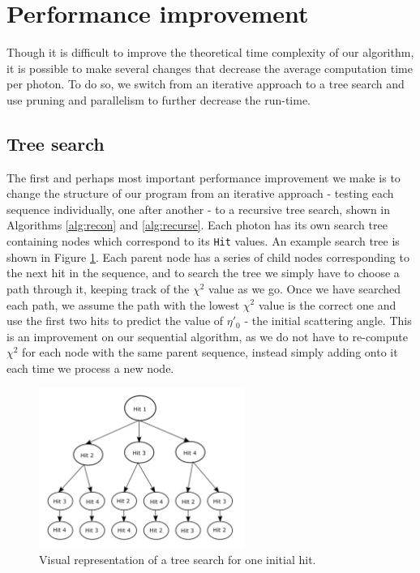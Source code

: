 \section{Performance improvement}
Though it is difficult to improve the theoretical time complexity of our algorithm, it is possible to make several changes that decrease the average computation time per photon. To do so, we switch from an iterative approach to a tree search and use pruning and parallelism to further decrease the run-time.

\subsection{Tree search}
The first and perhaps most important performance improvement we make is to change the structure of our program from an iterative approach - testing each sequence individually, one after another - to a recursive tree search, shown in Algorithms \ref{alg:recon} and \ref{alg:recurse}. Each photon has its own search tree containing nodes which correspond to its \texttt{Hit} values. An example search tree is shown in Figure \ref{fig:tree}. Each parent node has a series of child nodes corresponding to the next hit in the sequence, and to search the tree we simply have to choose a path through it, keeping track of the $\chi^2$ value as we go. Once we have searched each path, we assume the path with the lowest $\chi^2$ value is the correct one and use the first two hits to predict the value of $\eta'_0$ - the initial scattering angle. This is an improvement on our sequential algorithm, as we do not have to re-compute $\chi^2$ for each node with the same parent sequence, instead simply adding onto it each time we process a new node.

\begin{figure}
    \centering
    \includegraphics[width=0.6\textwidth]{tree_search_graphic.png}
    \caption{Visual representation of a tree search for one initial hit.}
    \label{fig:tree}
\end{figure}

